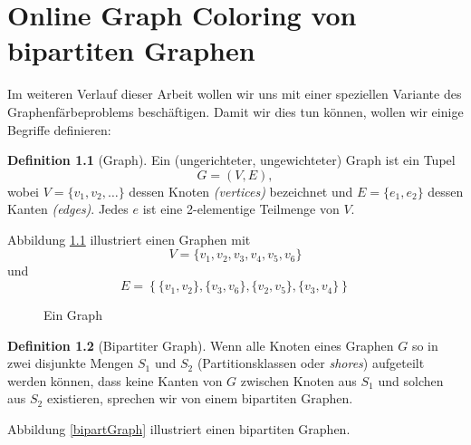 \documentclass[11pt]{scrreprt} %
\theoremstyle{definition}
\newtheorem{definition}{Definition}
\begin{document}
\chapter{Online Graph Coloring von bipartiten Graphen}

Im weiteren Verlauf dieser Arbeit wollen wir uns mit einer speziellen Variante des Graphenfärbeproblems beschäftigen. Damit wir dies tun können, wollen wir einige Begriffe definieren:

\begin{definition}[Graph]

Ein (ungerichteter, ungewichteter) Graph ist ein Tupel
\[
	G = (V, E),
\]
wobei $V = \{v_1, v_2, \dots \}$ dessen Knoten {\sl (vertices)} bezeichnet und $E = \{ e_1, e_2 \}$ dessen Kanten {\sl (edges)}. Jedes $e$ ist eine 2-elementige Teilmenge von $V$. \cite{biggs}

\end{definition}

Abbildung \ref{graph} illustriert einen Graphen mit
\[
	V = \{v_1,v_2,v_3,v_4,v_5,v_6\}
\]
und
\[
	E = \left\{  \{v_1,v_2\}, \{v_3,v_6\}, \{v_2,v_5\}, \{v_3,v_4\}  \right\}
\]

\begin{figure}
\caption{Ein Graph}
\label{graph}
\begin{center}


\end{center}
\end{figure}

\begin{definition}[Bipartiter Graph]
Wenn alle Knoten eines Graphen $G$ so in zwei disjunkte Mengen $S_1$ und $S_2$ (Partitionsklassen oder {\sl shores}) aufgeteilt werden können, dass keine Kanten von $G$ zwischen Knoten aus $S_1$ und solchen aus $S_2$ existieren, sprechen wir von einem bipartiten Graphen.
\end{definition}

Abbildung \ref{bipartGraph} illustriert einen bipartiten Graphen.
\end{document}
